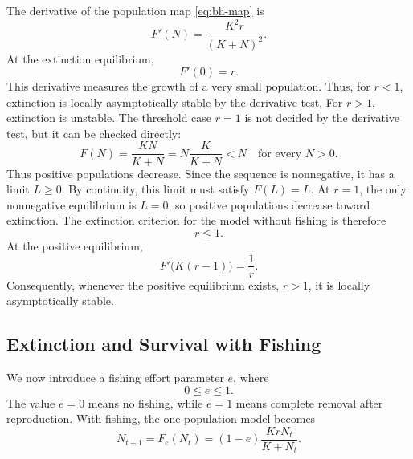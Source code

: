 \documentclass{article}
\numberwithin{equation}{section}
\begin{document}
The derivative of the population map \eqref{eq:bh-map} is
\begin{equation*}
    F'(N)=\frac{K^2r}{(K+N)^2}.
\end{equation*}
At the extinction equilibrium,
\begin{equation*}
    F'(0)=r.
\end{equation*}
This derivative measures the growth of a very small population. Thus,
for $r<1$, extinction is locally asymptotically stable by the derivative
test. For $r>1$, extinction is unstable. The threshold case $r=1$ is not
decided by the derivative test, but it can be checked directly:
\begin{equation*}
    F(N)
    =\frac{KN}{K+N}
    =N\frac{K}{K+N}
    <N
    \quad \text{for every } N>0.
\end{equation*}
Thus positive populations decrease. Since the sequence is nonnegative,
it has a limit $L\geq 0$. By continuity, this limit must satisfy
$F(L)=L$. At $r=1$, the only nonnegative equilibrium is $L=0$, so
positive populations decrease toward extinction. The extinction
criterion for the model without fishing is therefore
\begin{equation*}
    r \leq 1.
\end{equation*}
At the positive equilibrium,
\begin{equation*}
    F'\bigl(K(r-1)\bigr)=\frac{1}{r}.
\end{equation*}
Consequently, whenever the positive equilibrium exists, $r>1$, it is
locally asymptotically stable.
\subsection{Extinction and Survival with Fishing}
We now introduce a fishing effort parameter $e$, where
\begin{equation*}
    0 \leq e \leq 1.
\end{equation*}
The value $e=0$ means no fishing, while $e=1$ means complete removal
after reproduction. With fishing, the one-population model becomes
\begin{equation}
    \label{eq:fishing-map}
    N_{t+1}
    = F_e(N_t)
    = (1-e)\frac{K r N_t}{K+N_t}.
\end{equation}
\end{document}
